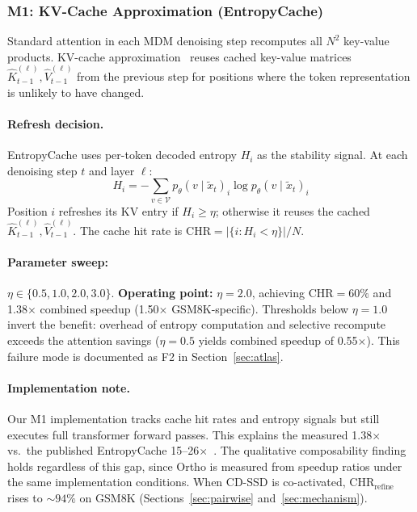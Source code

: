 \documentclass{article}
\newcommand{\chr}{\text{CHR}}
\begin{document}
\subsubsection{M1: KV-Cache Approximation (EntropyCache)}

Standard attention in each MDM denoising step recomputes all $N^2$ key-value products. KV-cache
approximation~\cite{entropycache} reuses cached key-value matrices $\hat{K}_{t-1}^{(\ell)},
\hat{V}_{t-1}^{(\ell)}$ from the previous step for positions where the token representation is
unlikely to have changed.

\paragraph{Refresh decision.} EntropyCache uses per-token decoded entropy $H_i$ as the stability
signal. At each denoising step $t$ and layer $\ell$:
\begin{equation}
  H_i = -\sum_{v \in \mathcal{V}} p_\theta(v \mid \tilde{x}_t)_i \log p_\theta(v \mid \tilde{x}_t)_i
\end{equation}
Position $i$ refreshes its KV entry if $H_i \geq \eta$; otherwise it reuses the cached
$\hat{K}_{t-1}^{(\ell)}, \hat{V}_{t-1}^{(\ell)}$. The cache hit rate is
$\chr = |\{i : H_i < \eta\}| / N$.

\paragraph{Parameter sweep:} $\eta \in \{0.5, 1.0, 2.0, 3.0\}$. \textbf{Operating point:}
$\eta = 2.0$, achieving $\chr = 60\%$ and 1.38$\times$ combined speedup (1.50$\times$
GSM8K-specific). Thresholds below $\eta = 1.0$ invert the benefit: overhead of entropy computation
and selective recompute exceeds the attention savings ($\eta = 0.5$ yields combined speedup of
0.55$\times$). This failure mode is documented as F2 in Section~\ref{sec:atlas}.

\paragraph{Implementation note.} Our M1 implementation tracks cache hit rates and entropy signals
but still executes full transformer forward passes. This explains the measured 1.38$\times$ vs.\ the
published EntropyCache 15--26$\times$~\cite{entropycache}. The qualitative composability finding
holds regardless of this gap, since Ortho is measured from speedup ratios under the same
implementation conditions. When CD-SSD is co-activated, $\chr_{\text{refine}}$ rises to ${\sim}94\%$
on GSM8K (Sections~\ref{sec:pairwise} and~\ref{sec:mechanism}).
\end{document}

